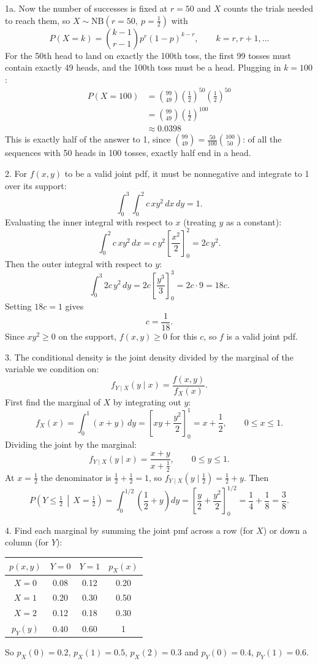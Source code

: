 \documentclass{article}
\begin{document}
1a. Now the number of successes is fixed at $r = 50$ and $X$ counts the trials needed to reach them,
so $X \sim \text{NB}(r = 50,\ p = \frac{1}{2})$ with
\[
P(X = k) = \binom{k-1}{r-1} p^r (1-p)^{k-r}, \qquad k = r, r+1, \dots
\]
For the 50th head to land on exactly the 100th toss, the first 99 tosses must contain exactly 49 heads,
and the 100th toss must be a head. Plugging in $k = 100$:
\begin{align*}
P(X = 100) &= \binom{99}{49} \left(\tfrac{1}{2}\right)^{50} \left(\tfrac{1}{2}\right)^{50} \\
&= \binom{99}{49} \left(\tfrac{1}{2}\right)^{100} \\
&\approx 0.0398
\end{align*}
This is exactly half of the answer to 1, since $\binom{99}{49} = \frac{50}{100}\binom{100}{50}$:
of all the sequences with 50 heads in 100 tosses, exactly half end in a head.

2. For $f(x, y)$ to be a valid joint pdf, it must be nonnegative and integrate to 1 over its support:
\[
\int_0^3 \int_0^2 c\, x y^2 \, dx \, dy = 1.
\]
Evaluating the inner integral with respect to $x$ (treating $y$ as a constant):
\[
\int_0^2 c\, x y^2 \, dx = c\, y^2 \left[ \frac{x^2}{2} \right]_0^2 = 2c\, y^2.
\]
Then the outer integral with respect to $y$:
\[
\int_0^3 2c\, y^2 \, dy = 2c \left[ \frac{y^3}{3} \right]_0^3 = 2c \cdot 9 = 18c.
\]
Setting $18c = 1$ gives
\[
c = \frac{1}{18}.
\]
Since $x y^2 \ge 0$ on the support, $f(x, y) \ge 0$ for this $c$, so $f$ is a valid joint pdf.

3. The conditional density is the joint density divided by the marginal of the variable we condition on:
\[
f_{Y \mid X}(y \mid x) = \frac{f(x, y)}{f_X(x)}.
\]
First find the marginal of $X$ by integrating out $y$:
\[
f_X(x) = \int_0^1 (x + y) \, dy = \left[ xy + \frac{y^2}{2} \right]_0^1 = x + \frac{1}{2}, \qquad 0 \le x \le 1.
\]
Dividing the joint by the marginal:
\[
f_{Y \mid X}(y \mid x) = \frac{x + y}{x + \frac{1}{2}}, \qquad 0 \le y \le 1.
\]
At $x = \frac{1}{2}$ the denominator is $\frac{1}{2} + \frac{1}{2} = 1$, so $f_{Y \mid X}\left(y \mid \tfrac{1}{2}\right) = \frac{1}{2} + y$. Then
\[
P\left(Y \le \tfrac{1}{2} \,\middle|\, X = \tfrac{1}{2}\right) = \int_0^{1/2} \left( \frac{1}{2} + y \right) dy
= \left[ \frac{y}{2} + \frac{y^2}{2} \right]_0^{1/2} = \frac{1}{4} + \frac{1}{8} = \frac{3}{8}.
\]

4. Find each marginal by summing the joint pmf across a row (for $X$) or down a column (for $Y$):
\begin{center}
\renewcommand{\arraystretch}{1.3}
\begin{tabular}{c|cc|c}
$p(x, y)$ & $Y = 0$ & $Y = 1$ & $p_X(x)$ \\
\hline
$X = 0$ & 0.08 & 0.12 & 0.20 \\
$X = 1$ & 0.20 & 0.30 & 0.50 \\
$X = 2$ & 0.12 & 0.18 & 0.30 \\
\hline
$p_Y(y)$ & 0.40 & 0.60 & 1 \\
\end{tabular}
\end{center}
So $p_X(0) = 0.2$, $p_X(1) = 0.5$, $p_X(2) = 0.3$ and $p_Y(0) = 0.4$, $p_Y(1) = 0.6$.
\end{document}

